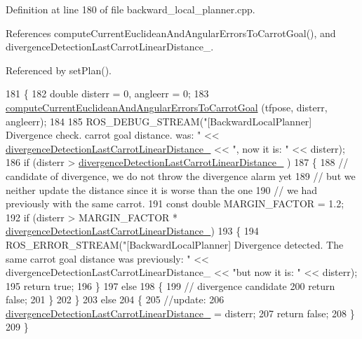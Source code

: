 Definition at line 180 of file backward\+\_\+local\+\_\+planner.\+cpp.



References compute\+Current\+Euclidean\+And\+Angular\+Errors\+To\+Carrot\+Goal(), and divergence\+Detection\+Last\+Carrot\+Linear\+Distance\+\_\+.



Referenced by set\+Plan().


\begin{DoxyCode}
181         \{
182             \textcolor{keywordtype}{double} disterr = 0, angleerr = 0;
183             \hyperlink{classcl__move__base__z_1_1backward__local__planner_1_1BackwardLocalPlanner_ad39ba029c760fc63ea286c74b5b9b795}{computeCurrentEuclideanAndAngularErrorsToCarrotGoal}
      (tfpose, disterr, angleerr);
184 
185             ROS\_DEBUG\_STREAM(\textcolor{stringliteral}{"[BackwardLocalPlanner] Divergence check. carrot goal distance. was: "} << 
      \hyperlink{classcl__move__base__z_1_1backward__local__planner_1_1BackwardLocalPlanner_a3187b3b0c9a640133556efd056f2e736}{divergenceDetectionLastCarrotLinearDistance\_} << \textcolor{stringliteral}{", now it is: "}
       << disterr);
186             \textcolor{keywordflow}{if} (disterr > \hyperlink{classcl__move__base__z_1_1backward__local__planner_1_1BackwardLocalPlanner_a3187b3b0c9a640133556efd056f2e736}{divergenceDetectionLastCarrotLinearDistance\_}
      )
187             \{
188                 \textcolor{comment}{// candidate of divergence, we do not throw the divergence alarm yet}
189                 \textcolor{comment}{// but we neither update the distance since it is worse than the one}
190                 \textcolor{comment}{// we had previously with the same carrot.}
191                 \textcolor{keyword}{const} \textcolor{keywordtype}{double} MARGIN\_FACTOR = 1.2;
192                 \textcolor{keywordflow}{if} (disterr > MARGIN\_FACTOR * 
      \hyperlink{classcl__move__base__z_1_1backward__local__planner_1_1BackwardLocalPlanner_a3187b3b0c9a640133556efd056f2e736}{divergenceDetectionLastCarrotLinearDistance\_})
193                 \{
194                     ROS\_ERROR\_STREAM(\textcolor{stringliteral}{"[BackwardLocalPlanner] Divergence detected. The same carrot goal
       distance was previously: "} << divergenceDetectionLastCarrotLinearDistance\_ << \textcolor{stringliteral}{"but now it is: "} << disterr);
195                     \textcolor{keywordflow}{return} \textcolor{keyword}{true};
196                 \}
197                 \textcolor{keywordflow}{else}
198                 \{
199                     \textcolor{comment}{// divergence candidate}
200                     \textcolor{keywordflow}{return} \textcolor{keyword}{false};
201                 \}
202             \}
203             \textcolor{keywordflow}{else}
204             \{
205                 \textcolor{comment}{//update:}
206                 \hyperlink{classcl__move__base__z_1_1backward__local__planner_1_1BackwardLocalPlanner_a3187b3b0c9a640133556efd056f2e736}{divergenceDetectionLastCarrotLinearDistance\_} = 
      disterr;
207                 \textcolor{keywordflow}{return} \textcolor{keyword}{false};
208             \}
209         \}
\end{DoxyCode}
